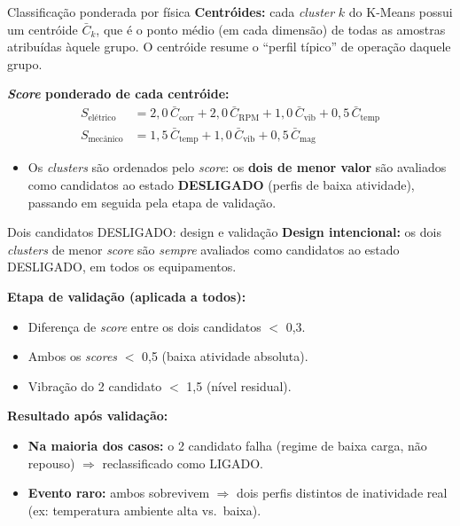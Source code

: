 \documentclass{beamer}
\begin{document}
\begin{frame}{Classificação ponderada por física}
    \textbf{Centróides:} cada \textit{cluster} $k$ do K-Means possui um centróide $\bar{C}_k$, que é o ponto médio (em cada dimensão) de todas as amostras atribuídas àquele grupo. O centróide resume o ``perfil típico'' de operação daquele grupo.

    \vspace{0.2cm}
    \textbf{\textit{Score} ponderado de cada centróide:}
    \begin{align*}
        S_{\text{elétrico}}  &= 2{,}0\,\bar{C}_{\text{corr}} + 2{,}0\,\bar{C}_{\text{RPM}} + 1{,}0\,\bar{C}_{\text{vib}} + 0{,}5\,\bar{C}_{\text{temp}} \\
        S_{\text{mecânico}} &= 1{,}5\,\bar{C}_{\text{temp}} + 1{,}0\,\bar{C}_{\text{vib}} + 0{,}5\,\bar{C}_{\text{mag}}
    \end{align*}
    \begin{itemize}
        \item Os \textit{clusters} são ordenados pelo \textit{score}: os \textbf{dois de menor valor} são avaliados como candidatos ao estado \textbf{DESLIGADO} (perfis de baixa atividade), passando em seguida pela etapa de validação.
    \end{itemize}
\end{frame}

\begin{frame}{Dois candidatos DESLIGADO: design e validação}
    \textbf{Design intencional:} os dois \textit{clusters} de menor \textit{score} são \textit{sempre} avaliados como candidatos ao estado DESLIGADO, em todos os equipamentos.

    \vspace{0.2cm}
    \textbf{Etapa de validação (aplicada a todos):}
    \begin{itemize}
        \item Diferença de \textit{score} entre os dois candidatos $<$ 0,3.
        \item Ambos os \textit{scores} $<$ 0,5 (baixa atividade absoluta).
        \item Vibração do 2\textdegree{} candidato $<$ 1,5 (nível residual).
    \end{itemize}

    \vspace{0.2cm}
    \textbf{Resultado após validação:}
    \begin{itemize}
        \item \textbf{Na maioria dos casos:} o 2\textdegree{} candidato falha (regime de baixa carga, não repouso) $\Rightarrow$ reclassificado como LIGADO.
        \item \textbf{Evento raro:} ambos sobrevivem $\Rightarrow$ dois perfis distintos de inatividade real (ex: temperatura ambiente alta vs.\ baixa).
    \end{itemize}

\end{frame}
\end{document}
